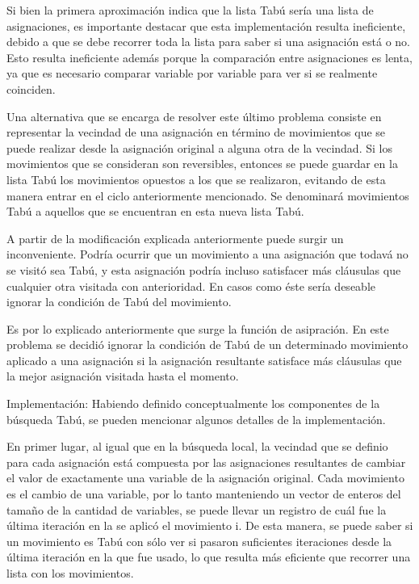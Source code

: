 \documentclass[a4paper,10pt]{article}
\begin{document}
Si bien la primera aproximaci\'on indica que la lista Tab\'u ser\'ia una lista de asignaciones, es importante destacar que esta implementaci\'on resulta ineficiente, debido a que se debe recorrer toda la lista para saber si una asignaci\'on est\'a o no. Esto resulta ineficiente adem\'as porque la comparaci\'on entre asignaciones es lenta, ya que es necesario comparar variable por variable para ver si se realmente coinciden.

Una alternativa que se encarga de resolver este \'ultimo problema consiste en representar la vecindad de una asignaci\'on en t\'ermino de movimientos que se puede realizar desde la asignaci\'on original a alguna otra de la vecindad. Si los movimientos que se consideran son reversibles, entonces se puede guardar en la lista Tab\'u los movimientos opuestos a los que se realizaron, evitando de esta manera entrar en el ciclo anteriormente mencionado. Se denominar\'a movimientos Tab\'u a aquellos que se encuentran en esta nueva lista Tab\'u.

A partir de la modificaci\'on explicada anteriormente puede surgir un inconveniente. Podr\'ia ocurrir que un movimiento a una asignaci\'on que todav\'a no se visit\'o sea Tab\'u, y esta asignaci\'on podr\'ia incluso satisfacer m\'as cl\'ausulas que cualquier otra visitada con anterioridad. En casos como \'este ser\'ia deseable ignorar la condici\'on de Tab\'u del movimiento. 

Es por lo explicado anteriormente que surge la funci\'on de asipraci\'on. En este problema se decidi\'o ignorar la condici\'on de Tab\'u de un determinado movimiento aplicado a una asignaci\'on si la asignaci\'on resultante satisface m\'as cl\'ausulas que la mejor asignaci\'on visitada hasta el momento.


Implementaci\'on:
Habiendo definido conceptualmente los componentes de la b\'usqueda Tab\'u, se pueden mencionar algunos detalles de la implementaci\'on.

En primer lugar, al igual que en la b\'usqueda local, la vecindad que se definio para cada asignaci\'on est\'a compuesta por las asignaciones resultantes de cambiar el valor de exactamente una variable de la asignaci\'on original. Cada movimiento es el cambio de una variable, por lo tanto manteniendo un vector de enteros del tama\~{n}o de la cantidad de variables, se puede llevar un registro de cu\'al fue la \'ultima iteraci\'on en la se aplic\'o el movimiento i. De esta manera, se puede saber si un movimiento es Tab\'u con s\'olo ver si pasaron suficientes iteraciones desde la \'ultima iteraci\'on en la que fue usado, lo que resulta m\'as eficiente que recorrer una lista con los movimientos.
\end{document}
